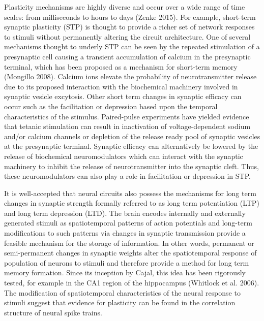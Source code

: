 \documentclass{ucetd}
\begin{document}
Plasticity mechanisms are highly diverse and occur over a wide range of time scales: from milliseconds to hours to days (Zenke 2015). For example, short-term synaptic plasticity (STP) is thought to provide a richer set of network responses to stimuli without permanently altering the circuit architecture. One of several mechanisms thought to underly STP can be seen by the repeated stimulation of a presynaptic cell causing a transient accumulation of calcium in the presynaptic terminal, which has been proposed as a mechanism for short-term memory (Mongillo 2008). Calcium ions elevate the probability of neurotransmitter release due to its proposed interaction with the biochemical machinery involved in synaptic vesicle excytosis. Other short term changes in synaptic efficacy can occur such as the facilitation or depression based upon the temporal characteristics of the stimulus. Paired-pulse experiments have yielded evidence that tetanic stimulation can result in inactivation of voltage-dependent sodium and/or calcium channels or depletion of the release ready pool of synaptic vesicles at the presynaptic terminal. Synaptic efficacy can alternatively be lowered by the release of biochemical neuromodulators which can interact with the synaptic machinery to inhibit the release of neurotransmitter into the synaptic cleft. Thus, these neuromodulators can also play a role in facilitation or depression in STP.

It is well-accepted that neural circuits also possess the mechanisms for long term changes in synaptic strength formally referred to as long term potentiation (LTP) and long term depression (LTD). The brain encodes internally and externally generated stimuli as spatiotemporal patterns of action potentials and long-term modifications to such patterns via changes in synaptic transmission provide a feasible mechanism for the storage of information. In other words, permanent or semi-permanent changes in synaptic weights alter the spatiotemporal response of population of neurons to stimuli and therefore provide a method for long term memory formation. Since its inception by Cajal, this idea has been rigorously tested, for example in the CA1 region of the hippocampus (Whitlock et al. 2006). The modification of spatiotemporal characteristics of the neural response to stimuli suggest that evidence for plasticity can be found in the correlation structure of neural spike trains.
\end{document}
